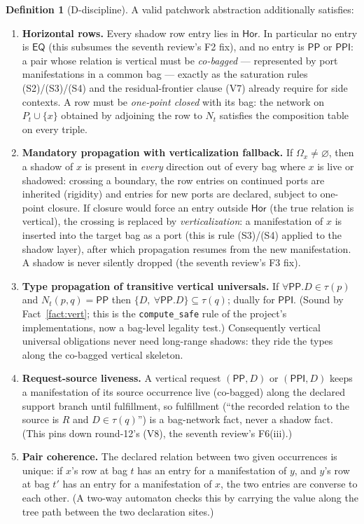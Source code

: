 \documentclass[11pt]{article}
\theoremstyle{definition}
\newtheorem{definition}[theorem]{Definition}
\newcommand{\EQ}{\mathsf{EQ}}
\newcommand{\PP}{\mathsf{PP}}
\newcommand{\PPI}{\mathsf{PPI}}
\newcommand{\Hor}{\mathsf{Hor}}
\newcommand{\code}[1]{\texttt{#1}}
\begin{document}
\begin{definition}[D-discipline]\label{def:D}
A valid patchwork abstraction additionally satisfies:
\begin{enumerate}[label=(D\arabic*),leftmargin=2.6em]
\item \textbf{Horizontal rows.}  Every shadow row entry lies in $\Hor$.
In particular no entry is $\EQ$ (this subsumes the seventh review's F2
fix), and no entry is $\PP$ or $\PPI$: a pair whose relation is vertical
must be \emph{co-bagged} --- represented by port manifestations in a
common bag --- exactly as the saturation rules (S2)/(S3)/(S4) and the
residual-frontier clause (V7) already require for side contexts.  A row
must be \emph{one-point closed} with its bag: the network on
$P_t\cup\{x\}$ obtained by adjoining the row to $N_t$ satisfies the
composition table on every triple.
\item \textbf{Mandatory propagation with verticalization fallback.}  If
$\Omega_x\neq\varnothing$, then a shadow of $x$ is present in
\emph{every} direction out of every bag where $x$ is live or shadowed:
crossing a boundary, the row entries on continued ports are inherited
(rigidity) and entries for new ports are declared, subject to one-point
closure.  If closure would force an entry outside $\Hor$ (the true
relation is vertical), the crossing is replaced by
\emph{verticalization}: a manifestation of $x$ is inserted into the
target bag as a port (this is rule (S3)/(S4) applied to the shadow
layer), after which propagation resumes from the new manifestation.  A
shadow is never silently dropped (the seventh review's F3 fix).
\item \textbf{Type propagation of transitive vertical universals.}  If
$\forall\PP.D\in\tau(p)$ and $N_t(p,q)=\PP$ then
$\{D,\ \forall\PP.D\}\subseteq\tau(q)$; dually for $\PPI$.  (Sound by
Fact~\ref{fact:vert}; this is the \code{compute\_safe} rule of the
project's implementations, now a bag-level legality test.)  Consequently
vertical universal obligations never need long-range shadows: they ride
the types along the co-bagged vertical skeleton.
\item \textbf{Request-source liveness.}  A vertical request
$(\PP,D)$ or $(\PPI,D)$ keeps a manifestation of its source occurrence
live (co-bagged) along the declared support branch until fulfillment, so
fulfillment (``the recorded relation to the source is $R$ and
$D\in\tau(q)$'') is a bag-network fact, never a shadow fact.  (This
pins down round-12's (V8), the seventh review's F6(iii).)
\item \textbf{Pair coherence.}  The declared relation between two given
occurrences is unique: if $x$'s row at bag $t$ has an entry for a
manifestation of $y$, and $y$'s row at bag $t'$ has an entry for a
manifestation of $x$, the two entries are converse to each other.  (A
two-way automaton checks this by carrying the value along the tree path
between the two declaration sites.)
\end{enumerate}
\end{definition}
\end{document}
